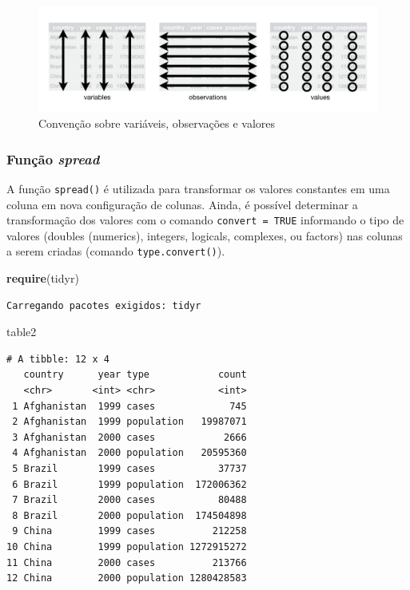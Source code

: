 \documentclass[12pt,brazil,oneside]{book}
\newenvironment{Shaded}{\begin{snugshade}}{\end{snugshade}}
\newcommand{\KeywordTok}[1]{\textcolor[rgb]{0.13,0.29,0.53}{\textbf{#1}}}
\newcommand{\NormalTok}[1]{#1}
\begin{document}
\begin{figure}[H]

{\centering \includegraphics[width=0.7\linewidth]{tidy-1} 

}

\caption{Convenção sobre variáveis, observações e valores}\label{fig:dados}
\end{figure}

\hypertarget{funcao-spread}{%
\subsubsection{\texorpdfstring{Função \emph{spread}}{Função spread}}\label{funcao-spread}}

A função \texttt{spread()} é utilizada para transformar os valores constantes em uma coluna em nova configuração de colunas. Ainda, é possível determinar a transformação dos valores com o comando \texttt{convert\ =\ TRUE} informando o tipo de valores (doubles (numerics), integers, logicals, complexes, ou factors) nas colunas a serem criadas (comando \texttt{type.convert()}).

\begin{Shaded}
\begin{Highlighting}[]
\KeywordTok{require}\NormalTok{(tidyr)}
\end{Highlighting}
\end{Shaded}

\begin{verbatim}
Carregando pacotes exigidos: tidyr
\end{verbatim}

\begin{Shaded}
\begin{Highlighting}[]
\NormalTok{table2}
\end{Highlighting}
\end{Shaded}

\begin{verbatim}
# A tibble: 12 x 4
   country      year type            count
   <chr>       <int> <chr>           <int>
 1 Afghanistan  1999 cases             745
 2 Afghanistan  1999 population   19987071
 3 Afghanistan  2000 cases            2666
 4 Afghanistan  2000 population   20595360
 5 Brazil       1999 cases           37737
 6 Brazil       1999 population  172006362
 7 Brazil       2000 cases           80488
 8 Brazil       2000 population  174504898
 9 China        1999 cases          212258
10 China        1999 population 1272915272
11 China        2000 cases          213766
12 China        2000 population 1280428583
\end{verbatim}
\end{document}
